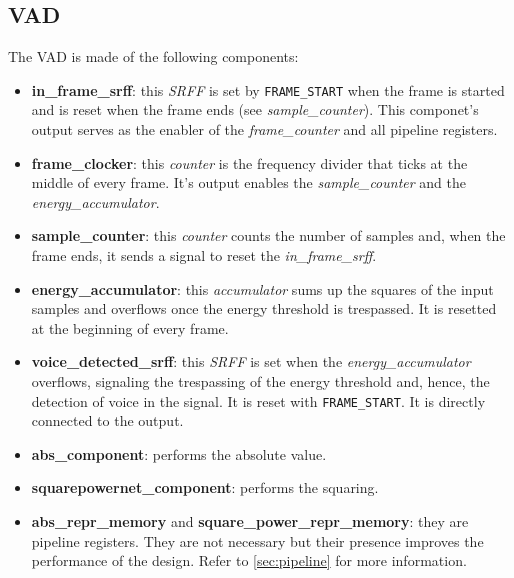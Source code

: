 \subsection{VAD}
The VAD is made of the following components:
\begin{itemize}
  \item \textbf{in\_frame\_srff}: this \emph{SRFF} is set by \texttt{FRAME\_START} when
    the frame is started and is reset when the frame ends (see \emph{sample\_counter}).
    This componet's output serves as the enabler of the \emph{frame\_counter}
    and all pipeline registers.
  \item \textbf{frame\_clocker}: this \emph{counter} is the frequency divider 
    that ticks at the middle of every frame. It's output enables the 
    \emph{sample\_counter} and the \emph{energy\_accumulator}.
  \item \textbf{sample\_counter}: this \emph{counter} counts the number of samples
    and, when the frame ends, it sends a signal to reset the \emph{in\_frame\_srff}.
  \item \textbf{energy\_accumulator}: this \emph{accumulator} sums up the 
    squares of the input samples and overflows once the energy threshold is 
    trespassed. It is resetted at the beginning of every frame.
  \item \textbf{voice\_detected\_srff}: this \emph{SRFF} is set when the 
    \emph{energy\_accumulator} overflows, signaling the trespassing of the 
    energy threshold and, hence, the detection of voice in the signal. It is 
    reset with \texttt{FRAME\_START}. It is directly connected to the output.
  \item \textbf{abs\_component}: performs the absolute value.
  \item \textbf{squarepowernet\_component}: performs the squaring.
  \item \textbf{abs\_repr\_memory} and \textbf{square\_power\_repr\_memory}: 
    they are pipeline registers. They are not necessary but their presence 
    improves the performance of the design. Refer to \cref{sec:pipeline} for 
    more information.
\end{itemize}

